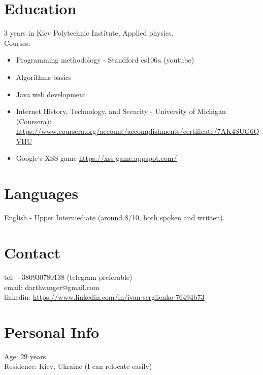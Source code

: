 \documentclass[a4paper, 14pt]{article}
\begin{document}
\section{Education}
	3 years in Kiev Polytechnic Institute, Applied physics. \\
  Courses:
  \begin{itemize}
    \item Programming methodology - Standford cs106a (youtube) \\
    \item Algorithms basics \\
    \item Java web development \\
    \item Internet History, Technology, and Security - University of Michigan (Coursera):  \url{https://www.coursera.org/account/accomplishments/certificate/7AK4SUG6QVHU} \\
    \item Google's XSS game \url{https://xss-game.appspot.com/}
  \end{itemize}

\section{Languages}
	English - Upper Intermediate (around 8/10, both spoken and written).

\section{Contact}
	tel. +380930780138 (telegram preferable) \\
	email: darthvanger@gmail.com \\
  linkedin: \url{https://www.linkedin.com/in/ivan-sergiienko-76494b73} \\

\section{Personal Info}
	Age: 29 years \\
  Residence: Kiev, Ukraine (I can relocate easily)
\end{document}
